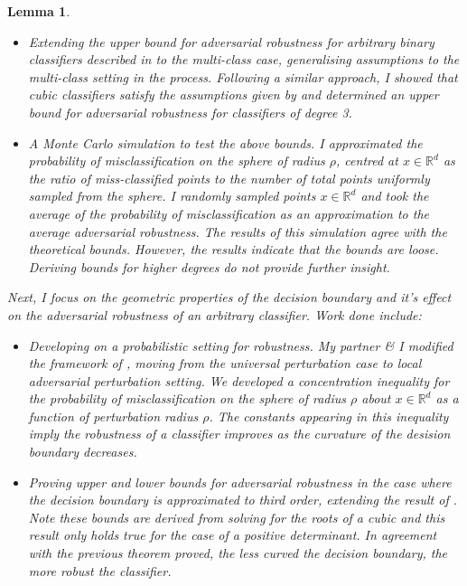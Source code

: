 \documentclass[a4paper,singlecolumn,12pt]{article}
\newtheorem{lemma}{Lemma}[subsection]
\begin{document}
\begin{lemma}
\begin{itemize}
    \item Extending the upper bound for adversarial robustness for arbitrary binary classifiers described in \cite{fawzi2016analysis} to the multi-class case, generalising assumptions to the multi-class setting in the process. Following a similar approach, I showed that cubic classifiers satisfy the assumptions given by \cite{fawzi2016analysis} and determined an upper bound for adversarial robustness for classifiers of degree 3.

    \item A Monte Carlo simulation to test the above bounds. I approximated the probability of misclassification on the sphere of radius $\rho$, centred at $x\in\mathbb{R}^{d}$ as the ratio of miss-classified points to the number of total points uniformly sampled from the sphere. I randomly sampled points $x\in\mathbb{R}^{d}$ and took the average of the probability of misclassification as an approximation to the average adversarial robustness. The results of this simulation agree with the theoretical bounds. However, the results indicate that the bounds are loose. Deriving bounds for higher degrees do not provide further insight.
\end{itemize}

Next, I focus on the geometric properties of the decision boundary and it's effect on the adversarial robustness of an arbitrary classifier. Work done include:

\begin{itemize}


    \item Developing on a probabilistic setting for robustness. My partner \& I modified the framework of \cite{moosavi-dezfooli2018robustness}, moving from the universal perturbation case to local adversarial perturbation setting. We developed a concentration inequality for the probability of misclassification on the sphere of radius $\rho$ about $x \in \mathbb{R}^{d}$ as a function of perturbation radius $\rho$. The constants appearing in this inequality imply the robustness of a classifier improves as the curvature of the desision boundary decreases.
    
    \item Proving upper and lower bounds for adversarial robustness in the case where the decision boundary is approximated to third order, extending the result of \cite{moosavidezfooli2018robustness}. Note these bounds are derived from solving for the roots of a cubic and this result only holds true for the case of a positive determinant. In agreement with the previous theorem proved, the less curved the decision boundary, the more robust the classifier.


\end{itemize}
\end{lemma}
\end{document}
